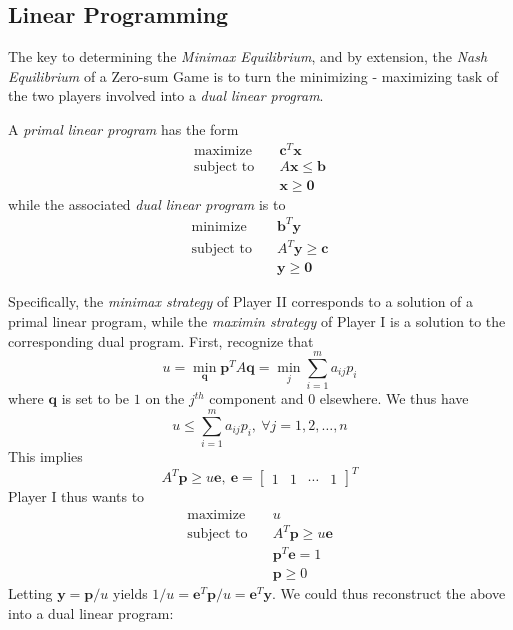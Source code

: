 \documentclass[journal, 11pt, a4paper, twoside]{IEEEtran}
\begin{document}
\subsection{Linear Programming}
The key to determining the \textit{Minimax Equilibrium}, and by extension, the \textit{Nash Equilibrium} of a Zero-sum Game is to turn the minimizing - maximizing task of the two players involved into a \textit{dual linear program}. 
\begin{definition}
    A \textit{primal linear program} has the form
    \begin{align*}
        \text{maximize}& \quad \bm{c}^T\bm{x} \\
        \text{subject to}& \quad A\bm{x} \leq \bm{b}\\
        & \quad \bm{x \geq 0}
    \end{align*}
    while the associated \textit{dual linear program} is to 
    \begin{align*}
        \text{minimize}& \quad \bm{b}^T\bm{y} \\
        \text{subject to}& \quad A^T\bm{y} \geq \bm{c}\\
        & \quad \bm{y \geq 0}
    \end{align*}
\end{definition}
\noindent Specifically, the \textit{minimax strategy} of Player II corresponds to a solution of a primal linear program, while the \textit{maximin strategy} of Player I is a solution to the corresponding dual program. First, recognize that \[
u= \min_{\bm{q}} \bm{p}^TA\bm{q} = \min_j \sum_{i = 1}^m a_{ij}p_i
\]
where $\bm{q}$ is set to be $1$ on the $j^{th}$ component and 0 elsewhere. We thus have 
\[
u \leq \sum_{i = 1}^m a_{ij} p_i, \ \forall j = 1, 2, \dots, n
\]
This implies 
\[
A^T\bm{p} \geq u \bm{e}, \ \bm{e} = \begin{bmatrix}
    1 & 1 & \cdots & 1
\end{bmatrix}^T
\]
Player I thus wants to 
    \begin{align*}
        \text{maximize}& \quad u\\
        \text{subject to}& \quad A^T\bm{p} \geq u \bm{e}\\
        & \quad \bm{p}^T\bm{e} = 1\\
        & \quad \bm{p} \geq 0
    \end{align*}
        Letting $\bm{y} = \bm{p}/{u}$ yields 
        \(
        {1/u} = \bm{e}^T\bm{p}/u = \bm{e}^T\bm{y}.
        \)
        We could thus reconstruct the above into a dual linear program:  
\end{document}
